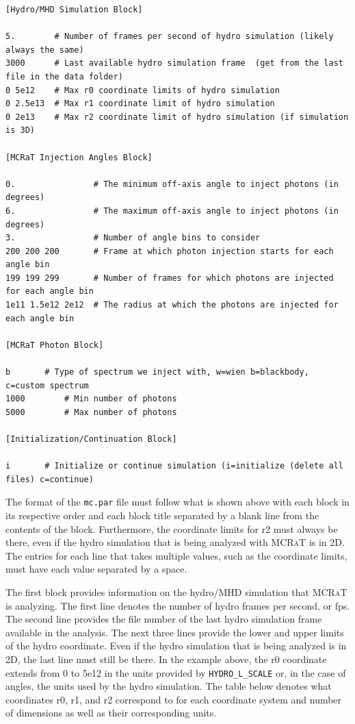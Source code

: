 \documentclass[12pt,a4paper]{article}
\newcommand{\mcrat}{\textsc{MCRaT}}
\begin{document}
{\small
\begin{verbatim}
[Hydro/MHD Simulation Block]

5.        # Number of frames per second of hydro simulation (likely always the same)
3000	  # Last available hydro simulation frame  (get from the last file in the data folder)
0 5e12	  # Max r0 coordinate limits of hydro simulation
0 2.5e13  # Max r1 coordinate limit of hydro simulation
0 2e13	  # Max r2 coordinate limit of hydro simulation (if simulation is 3D)

[MCRaT Injection Angles Block]

0.                # The minimum off-axis angle to inject photons (in degrees)
6.                # The maximum off-axis angle to inject photons (in degrees)
3.			      # Number of angle bins to consider
200 200 200       # Frame at which photon injection starts for each angle bin
199 199 299       # Number of frames for which photons are injected for each angle bin
1e11 1.5e12 2e12  # The radius at which the photons are injected for each angle bin

[MCRaT Photon Block]

b		# Type of spectrum we inject with, w=wien b=blackbody, c=custom spectrum
1000		# Min number of photons
5000		# Max number of photons

[Initialization/Continuation Block]

i		# Initialize or continue simulation (i=initialize (delete all files) c=continue) 
\end{verbatim}
}

The format of the \texttt{mc.par} file must follow what is shown above with each block in its respective order and each block title separated by a blank line from the contents of the block. Furthermore, the coordinate limits for r2 must always be there, even if the hydro simulation that is being analyzed with \mcrat{} is in 2D. The entries for each line that takes multiple values, such as the coordinate limits, must have each value separated by a space. 

The first block provides information on the hydro/MHD simulation that \mcrat{} is analyzing. The first line denotes the number of hydro frames per second, or fps. The second line provides the file number of the last hydro simulation frame available in the analysis. The next three lines provide the lower and upper limits of the hydro coordinate. Even if the hydro simulation that is being analyzed is in 2D, the last line must still be there. In the example above, the r0 coordinate extends from 0 to 5e12 in the units provided by \texttt{HYDRO\_L\_SCALE} or, in the case of angles, the units used by the hydro simulation. The table below denotes what coordinates r0, r1, and r2 correspond to for each coordinate system and number of dimensions as well as their corresponding units. 
\end{document}

